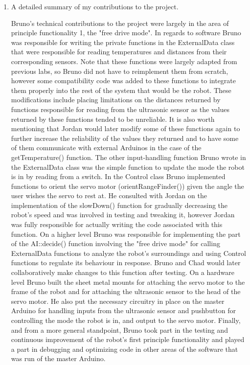 \documentclass[letterpaper,12pt]{article}
\begin{document}
 

\begin{enumerate}

\item A detailed summary of my contributions to the project. 

Bruno's technical contributions to the project were largely in the area of principle functionality 1, the "free drive mode". In regards to software Bruno was responsible for writing the private functions in the ExternalData class that were responsible for reading temperatures and distances from their corresponding sensors. Note that these functions were largely adapted from previous labs, so Bruno did not have to reimplement them from scratch, however some compatibility code was added to these functions to integrate them properly into the rest of the system that would be the robot. These modifications include placing limitations on the distances returned by functions responsible for reading from the ultrasonic sensor as the values returned by these functions tended to be unreliable. It is also worth mentioning that Jordan would later modify some of these functions again to further increase the reliability of the values they returned and to have some of them communicate with external Arduinos in the case of the getTemperature() function. The other input-handling function Bruno wrote in the ExternalData class was the simple function to update the mode the robot is in by reading from a switch. In the Control class Bruno implemented functions to orient the servo motor (orientRangeFinder()) given the angle the user wishes the servo to rest at. He consulted with Jordan on the implementation of the slowDown() function for gradually decreasing the robot's speed and was involved in testing and tweaking it, however Jordan was fully responsible for actually writing the code associated with this function. On a higher level Bruno was responsible for implementing the part of the AI::decide() function involving the "free drive mode" for calling ExternalData functions to analyze the robot's surroundings and using Control functions to regulate its behaviour in response. Bruno and Chad would later collaboratively make changes to this function after testing.  \newline \newline
On a hardware level Bruno built the sheet metal mounts for attaching the servo motor to the frame of the robot and for attaching the ultrasonic sensor to the head of the servo motor. He also put the necessary circuitry in place on the master Arduino for handling inputs from the ultrasonic sensor and pushbutton for controlling the mode the robot is in, and output to the servo motor.  \newline \newline 
Finally, and from a more general standpoint, Bruno took part in the testing and continuous improvement of the robot's first principle functionality and played a part in debugging and optimizing code in other areas of the software that was run of the master Arduino. 


\end{enumerate}
\end{document}
